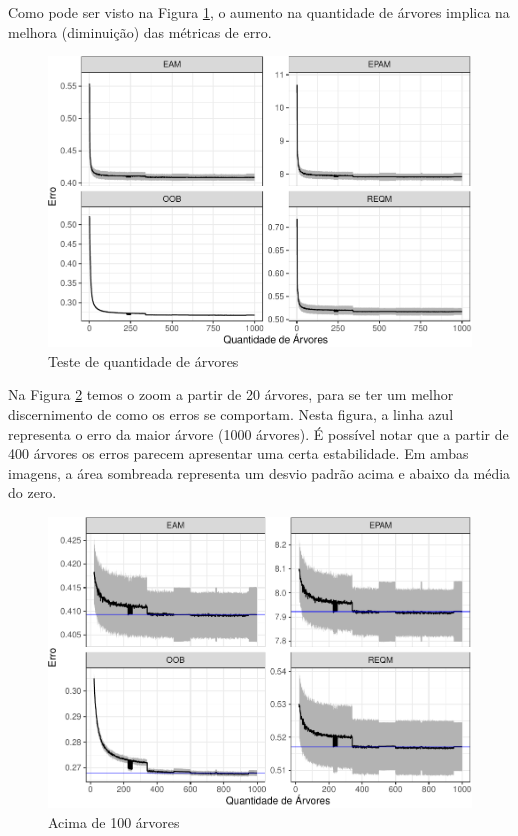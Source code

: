 \documentclass[
	12pt,				%
	a4paper,		%
	oneside,    %
	chapter=TITLE,		   %
	section=TITLE,		   %
	subsection=TITLE,	   %
	subsubsection=TITLE, %
	english,			%
	french,				%
	spanish,			%
	brazil,				%
]{abntex2}
\begin{document}
Como pode ser visto na Figura \ref{qtd_arvores}, o aumento na quantidade
de árvores implica na melhora (diminuição) das métricas de erro.

\begin{figure}
\centering
\includegraphics{00-TCC_files/figure-latex/qtd_arvores-1.pdf}
\caption{\label{qtd_arvores}Teste de quantidade de árvores}
\end{figure}

Na Figura \ref{qtd_arvores_zoom} temos o zoom a partir de 20 árvores,
para se ter um melhor discernimento de como os erros se comportam. Nesta
figura, a linha azul representa o erro da maior árvore (1000 árvores). É
possível notar que a partir de 400 árvores os erros parecem apresentar
uma certa estabilidade. Em ambas imagens, a área sombreada representa um
desvio padrão acima e abaixo da média do zero.

\begin{figure}
\centering
\includegraphics{00-TCC_files/figure-latex/qtd_arvores_zoom-1.pdf}
\caption{\label{qtd_arvores_zoom}Acima de 100 árvores}
\end{figure}
\end{document}
